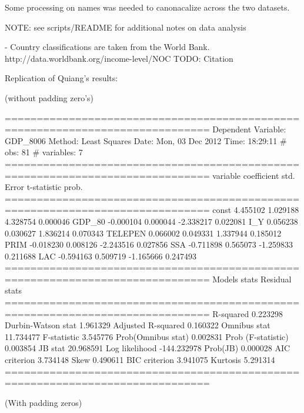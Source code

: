 Some processing on names was needed to canonacalize across the two datasets.

NOTE: see scripts/README for additional notes on data analysis

- Country classifications are taken from the World
Bank. http://data.worldbank.org/income-level/NOC
TODO: Citation


Replication of Quiang's results:

(without padding zero's)


==============================================================================
Dependent Variable: GDP_8006
Method: Least Squares
Date:  Mon, 03 Dec 2012
Time:  18:29:11
# obs:                  81
# variables:         7
==============================================================================
variable     coefficient     std. Error      t-statistic     prob.
==============================================================================
const           4.455102      1.029188      4.328754      0.000046
GDP_80          -0.000104      0.000044     -2.338217      0.022081
I_Y             0.056238      0.030627      1.836214      0.070343
TELEPEN           0.066002      0.049331      1.337944      0.185012
PRIM           -0.018230      0.008126     -2.243516      0.027856
SSA            -0.711898      0.565073     -1.259833      0.211688
LAC            -0.594163      0.509719     -1.165666      0.247493
==============================================================================
Models stats                         Residual stats
==============================================================================
R-squared             0.223298         Durbin-Watson stat   1.961329
Adjusted R-squared    0.160322         Omnibus stat         11.734477
F-statistic           3.545776         Prob(Omnibus stat)   0.002831
Prob (F-statistic)    0.003854                  JB stat              20.968591
Log likelihood       -144.232978                        Prob(JB)
0.000028
AIC criterion         3.734148         Skew                 0.490611
BIC criterion         3.941075         Kurtosis             5.291314
==============================================================================


(With padding zeros)

